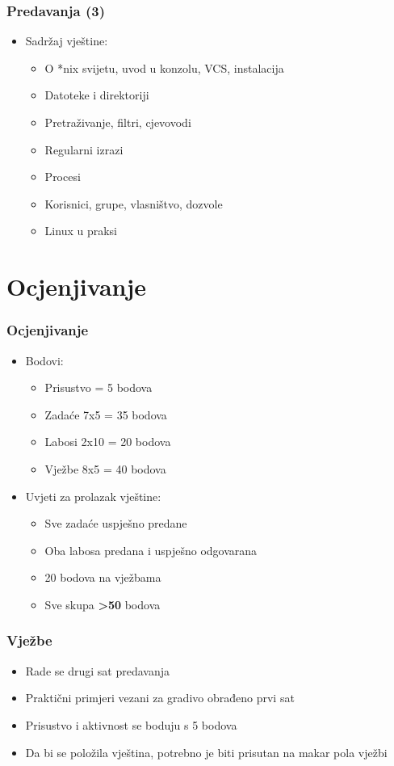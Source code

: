 \documentclass{beamer}
\begin{document}
\begin{frame}[t]
\frametitle{Predavanja (3)}
\begin{itemize}
	\item Sadržaj vještine:
	\begin{itemize}
		\item O *nix svijetu, uvod u konzolu, VCS, instalacija 
		\item Datoteke i direktoriji
		\item Pretraživanje, filtri, cjevovodi
    \item Regularni izrazi 
		\item Procesi
		\item Korisnici, grupe, vlasništvo, dozvole
		\item Linux u praksi 
	\end{itemize}
\end{itemize}
\end{frame}

\section{Ocjenjivanje}
\begin{frame}[t]
\frametitle{Ocjenjivanje}
\begin{itemize}
	\item Bodovi:
	\begin{itemize}
    \item Prisustvo   = 5  bodova
		\item Zadaće 7x5  = 35 bodova
		\item Labosi 2x10 = 20 bodova
		\item Vježbe 8x5  = 40 bodova
	\end{itemize}
	\item Uvjeti za prolazak vještine:
	\begin{itemize}
		\item Sve zadaće uspješno predane
		\item Oba labosa predana i uspješno odgovarana
		\item 20 bodova na vježbama
		\item Sve skupa \textbf{\textgreater 50} bodova
	\end{itemize}
\end{itemize}
\end{frame}

\begin{frame}[t]
\frametitle{Vježbe}
\begin{itemize}
	\item Rade se drugi sat predavanja
	\item Praktični primjeri vezani za gradivo obrađeno prvi sat
	\item Prisustvo i aktivnost se boduju s 5 bodova
	\item Da bi se položila vještina, potrebno je biti prisutan na makar pola vježbi
\end{itemize}
\end{frame}
\end{document}
